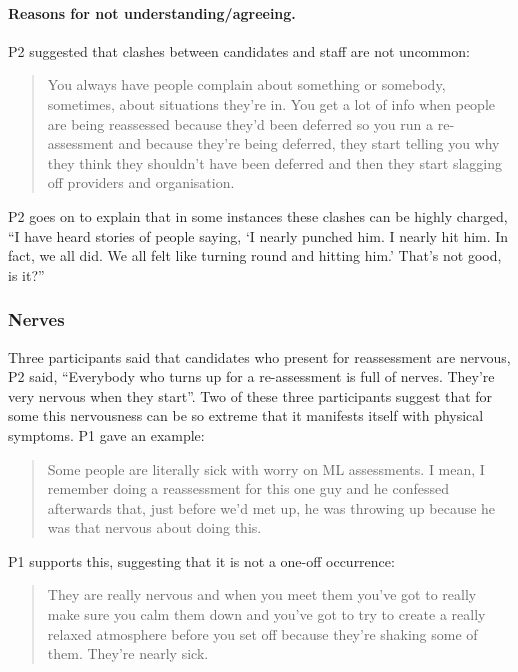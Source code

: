 \documentclass[a4paper,]{book}
\let\oldparagraph\paragraph
\renewcommand{\paragraph}[1]{\oldparagraph{#1}\mbox{}}
\begin{document}
\hypertarget{reasons-for-not-understandingagreeing.}{%
\paragraph{Reasons for not understanding/agreeing.}\label{reasons-for-not-understandingagreeing.}}

P2 suggested that clashes between candidates and staff are not uncommon:

\begin{quote}
You always have people complain about something or somebody, sometimes, about situations they're in. You get a lot of info when people are being reassessed because they'd been deferred so you run a re-assessment and because they're being deferred, they start telling you why they think they shouldn't have been deferred and then they start slagging off providers and organisation.
\end{quote}

P2 goes on to explain that in some instances these clashes can be highly charged, ``I have heard stories of people saying, `I nearly punched him. I nearly hit him. In fact, we all did. We all felt like turning round and hitting him.' That's not good, is it?''

\hypertarget{nerves}{%
\subsubsection{Nerves}\label{nerves}}

Three participants said that candidates who present for reassessment are nervous, P2 said, ``Everybody who turns up for a re-assessment is full of nerves. They're very nervous when they start''. Two of these three participants suggest that for some this nervousness can be so extreme that it manifests itself with physical symptoms. P1 gave an example:

\begin{quote}
Some people are literally sick with worry on ML assessments. I mean, I remember doing a reassessment for this one guy and he confessed afterwards that, just before we'd met up, he was throwing up because he was that nervous about doing this.
\end{quote}

P1 supports this, suggesting that it is not a one-off occurrence:

\begin{quote}
They are really nervous and when you meet them you've got to really make sure you calm them down and you've got to try to create a really relaxed atmosphere before you set off because they're shaking some of them. They're nearly sick.
\end{quote}
\end{document}
